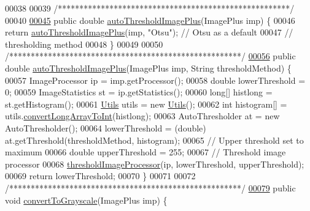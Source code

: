 \begin{DoxyCode}
00038 
00039   \textcolor{comment}{/******************************************************/}
00040   
\hypertarget{_computer_vision_8java_source_l00045}{}\hyperlink{classfunctions_1_1_computer_vision_a93e3c71f7e9e359a377ebed559810c28}{00045}   \textcolor{keyword}{public} \textcolor{keywordtype}{double} \hyperlink{classfunctions_1_1_computer_vision_a93e3c71f7e9e359a377ebed559810c28}{autoThresholdImagePlus}(ImagePlus imp) \{
00046     \textcolor{keywordflow}{return} \hyperlink{classfunctions_1_1_computer_vision_a93e3c71f7e9e359a377ebed559810c28}{autoThresholdImagePlus}(imp, \textcolor{stringliteral}{"Otsu"}); \textcolor{comment}{// Otsu as a default}
00047                                                 \textcolor{comment}{// thresholding method}
00048   \}
00049 
00050   \textcolor{comment}{/******************************************************/}
\hypertarget{_computer_vision_8java_source_l00056}{}\hyperlink{classfunctions_1_1_computer_vision_a682b3978d10477ebaf0c32969ff6650b}{00056}   \textcolor{keyword}{public} \textcolor{keywordtype}{double} \hyperlink{classfunctions_1_1_computer_vision_a682b3978d10477ebaf0c32969ff6650b}{autoThresholdImagePlus}(ImagePlus imp, String thresholdMethod) \{
00057     ImageProcessor ip = imp.getProcessor();
00058     \textcolor{keywordtype}{double} lowerThreshold = 0;
00059     ImageStatistics st = ip.getStatistics();
00060     \textcolor{keywordtype}{long}[] histlong = st.getHistogram();
00061     \hyperlink{classfunctions_1_1_utils}{Utils} utils = \textcolor{keyword}{new} \hyperlink{classfunctions_1_1_utils}{Utils}();
00062     \textcolor{keywordtype}{int} histogram[] = utils.\hyperlink{classfunctions_1_1_utils_af205010f6a95a6e41a837305446fd262}{convertLongArrayToInt}(histlong);
00063     AutoThresholder at = \textcolor{keyword}{new} AutoThresholder();
00064     lowerThreshold = (double) at.getThreshold(thresholdMethod, histogram);
00065     \textcolor{comment}{// Upper threshold set to maximum}
00066     \textcolor{keywordtype}{double} upperThreshold = 255;
00067     \textcolor{comment}{// Threshold image processor}
00068     \hyperlink{classfunctions_1_1_computer_vision_ae1ef4c4258127cb97bae706e7f65fc2e}{thresholdImageProcessor}(ip, lowerThreshold, upperThreshold);
00069     \textcolor{keywordflow}{return} lowerThreshold;
00070   \}
00071 
00072   \textcolor{comment}{/******************************************************/}
\hypertarget{_computer_vision_8java_source_l00079}{}\hyperlink{classfunctions_1_1_computer_vision_a4d0fe516e9ef71c60ba67150cf288030}{00079}   \textcolor{keyword}{public} \textcolor{keywordtype}{void} \hyperlink{classfunctions_1_1_computer_vision_a4d0fe516e9ef71c60ba67150cf288030}{convertToGrayscale}(ImagePlus imp) \{

\end{DoxyCode}
